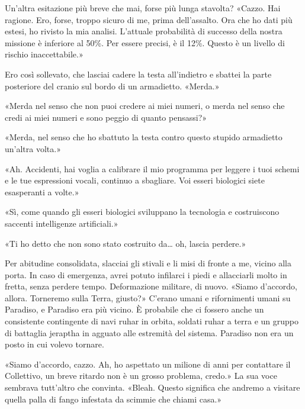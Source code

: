Un'altra esitazione più breve che mai, forse più lunga stavolta? «Cazzo.
Hai ragione. Ero, forse, troppo sicuro di me, prima dell'assalto. Ora
che ho dati più estesi, ho rivisto la mia analisi. L'attuale probabilità
di successo della nostra missione è inferiore al 50\%. Per essere
precisi, è il 12\%. Questo è un livello di rischio inaccettabile.»

Ero così sollevato, che lasciai cadere la testa all'indietro e sbattei
la parte posteriore del cranio sul bordo di un armadietto. «Merda.»

«Merda nel senso che non puoi credere ai miei numeri, o merda nel senso
che credi ai miei numeri e sono peggio di quanto pensassi?»

«Merda, nel senso che ho sbattuto la testa contro questo stupido
armadietto un'altra volta.»

«Ah. Accidenti, hai voglia a calibrare il mio programma per leggere i
tuoi schemi e le tue espressioni vocali, continuo a sbagliare. Voi
esseri biologici siete esasperanti a volte.»

«Sì, come quando gli esseri biologici sviluppano la tecnologia e
costruiscono saccenti intelligenze artificiali.»

«Ti ho detto che non sono stato costruito da\ldots{} oh, lascia
perdere.»

Per abitudine consolidata, slacciai gli stivali e li misi di fronte a
me, vicino alla porta. In caso di emergenza, avrei potuto infilarci i
piedi e allacciarli molto in fretta, senza perdere tempo. Deformazione
militare, di nuovo. «Siamo d'accordo, allora. Torneremo sulla Terra,
giusto?» C'erano umani e rifornimenti umani su Paradiso, e Paradiso era
più vicino. È probabile che ci fossero anche un consistente contingente
di navi ruhar in orbita, soldati ruhar a terra e un gruppo di battaglia
jeraptha in agguato alle estremità del sistema. Paradiso non era un
posto in cui volevo tornare.

«Siamo d'accordo, cazzo. Ah, ho aspettato un milione di anni per
contattare il Collettivo, un breve ritardo non è un grosso problema,
credo.» La sua voce sembrava tutt'altro che convinta. «Bleah. Questo
significa che andremo a visitare quella palla di fango infestata da
scimmie che chiami casa.»

